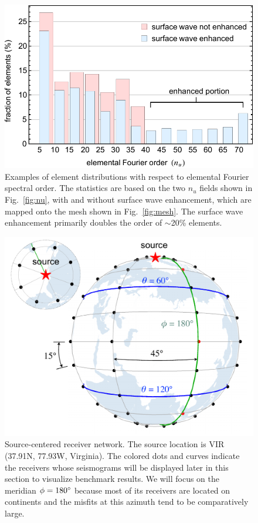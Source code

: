 \documentclass[extra,referee]{gji}
\begin{document}
\begin{figure}
  \centering
  \includegraphics[width=.6\textwidth]{fig/elecnt/elecnt.pdf}
  \caption{Examples of element distributions with respect to elemental 
  Fourier spectral order. The statistics are based on the two $n_u$ fields shown in Fig.~\ref{fig:nu},
  with and without surface wave enhancement, which are mapped onto the mesh
  shown in Fig.~\ref{fig:mesh}. 
  The surface wave enhancement primarily doubles the order of  
  $\sim$20\% elements.} 
  \label{fig:count}
\end{figure}

\begin{figure}
  \centering 
  \includegraphics[width=.6\textwidth]{fig/rec/recev.pdf} 
  \caption{Source-centered receiver network. The source location 
  is VIR (37.91\degr N, 77.93\degr W, Virginia). 
  The colored dots and curves indicate the receivers 
  whose seismograms will be displayed later in this section
  to visualize benchmark results. We will focus on the meridian $\phi=180\hbox{$^\circ$}$
  because most of its receivers are located on continents and the misfits 
  at this azimuth tend to be comparatively large. } 
  \label{fig:rec}
\end{figure}
\end{document}
